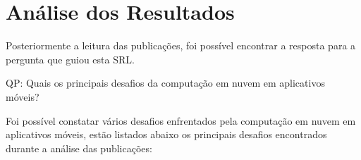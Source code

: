 \documentclass[12pt]{article}
\begin{document}


\section{Análise dos Resultados}

Posteriormente a leitura das publicações, foi possível encontrar a resposta para a pergunta que guiou esta SRL.

QP: Quais os principais desafios da computação em nuvem em aplicativos móveis?

Foi possível constatar vários desafios enfrentados pela computação em nuvem em aplicativos móveis, estão listados abaixo os
principais desafios encontrados durante a análise das publicações:
\end{document}
